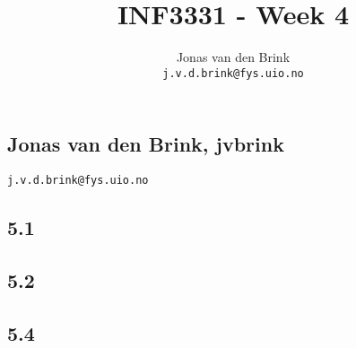 \documentclass[a4paper, 11pt, titlepage, english]{article}
\title{INF3331 - Week 4}
\author{Jonas van den Brink \\ \texttt{j.v.d.brink@fys.uio.no}}
\begin{document}
\pagestyle{empty}
\subsection*{Jonas van den Brink, jvbrink}
\texttt{j.v.d.brink@fys.uio.no}
\subsection*{5.1}

\subsection*{5.2}

\clearpage
\subsection*{5.4}

\end{document}
